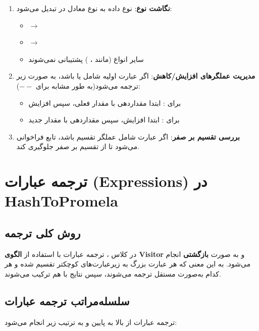\documentclass[12pt]{report}
\begin{document}
	\begin{enumerate}
		\item \textbf{نگاشت نوع}: نوع داده  به نوع معادل در  تبدیل می‌شود:
		\begin{itemize}
			\item {} $\rightarrow$ 
			\item {} $\rightarrow$ 
			\item سایر انواع (مانند ، ) پشتیبانی نمی‌شوند
		\end{itemize}
		
		\item \textbf{مدیریت عملگرهای افزایش/کاهش}: اگر عبارت اولیه شامل  یا  باشد، به صورت زیر ترجمه می‌شود(به طور مشابه برای $--$):
		\begin{itemize}
			\item برای : ابتدا مقداردهی با مقدار فعلی، سپس افزایش
			\item برای : ابتدا افزایش، سپس مقداردهی با مقدار جدید
		\end{itemize}
		
		\item \textbf{بررسی تقسیم بر صفر}: اگر عبارت شامل عملگر تقسیم باشد، تابع  فراخوانی می‌شود تا از تقسیم بر صفر جلوگیری کند.
	\end{enumerate}
	
	\section{ترجمه عبارات (Expressions) در HashToPromela}
	
	\subsection{روش کلی ترجمه}
	
	در کلاس ، ترجمه عبارات با استفاده از \textbf{الگوی Visitor} و به صورت \textbf{بازگشتی} انجام می‌شود. به این معنی که هر عبارت بزرگ به زیرعبارت‌های کوچکتر تقسیم شده و هر کدام به‌صورت مستقل ترجمه می‌شوند، سپس نتایج با هم ترکیب می‌شوند.
	
	\subsection{سلسله‌مراتب ترجمه عبارات}
	
	ترجمه عبارات از بالا به پایین و به ترتیب زیر انجام می‌شود:
	
\end{document}

